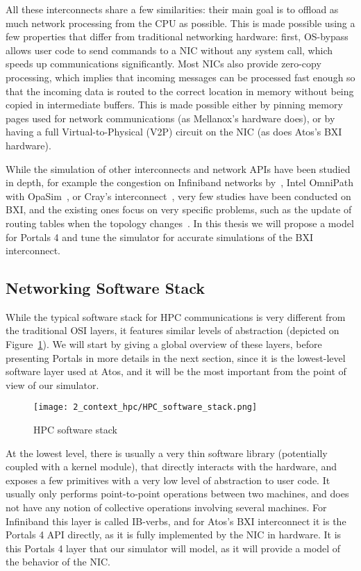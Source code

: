 All these interconnects share a few similarities: their main goal is to offload
as much network processing from the CPU as possible. This is made possible using
a few properties that differ from traditional networking hardware: first,
OS-bypass allows user code to send commands to a NIC without any system call,
which speeds up communications significantly. Most NICs also provide zero-copy
processing, which implies that incoming messages can be processed fast enough so
that the incoming data is routed to the correct location in memory without being
copied in intermediate buffers. This is made possible either by pinning memory
pages used for network communications (as Mellanox's hardware does), or by
having a full Virtual-to-Physical (V2P) circuit on the NIC (as does Atos's BXI
hardware).

While the simulation of other interconnects and network APIs have been studied
in depth, for example the congestion on Infiniband networks
by~\cite{Vienne2010}\cite{Gran2012}, Intel OmniPath with
OpaSim~\cite{Javier2018}, or Cray's interconnect~\cite{Mubarak2017}, very few
studies have been conducted on BXI, and the existing ones focus on very specific
problems, such as the update of routing tables when the topology
changes~\cite{Vigneras2016}. In this thesis we will propose a model for Portals
4 and tune the simulator for accurate simulations of the BXI interconnect.

\subsection{Networking Software Stack}
\label{subsec:2_context_hpc:software_stack}

While the typical software stack for HPC communications is very different from
the traditional OSI layers, it features similar levels of abstraction (depicted
on Figure~\ref{fig:2_context_hpc:HpcSoftwareStack}). We will start by giving a
global overview of these layers, before presenting Portals in more details in
the next section, since it is the lowest-level software layer used at Atos, and
it will be the most important from the point of view of our
simulator.

\begin{figure}[!ht]
    \centering
    \texttt{[image: 2\_context\_hpc/HPC\_software\_stack.png]}
    \caption{HPC software stack}
    \label{fig:2_context_hpc:HpcSoftwareStack}
\end{figure}

At the lowest level, there is usually a very thin software library (potentially
coupled with a kernel module), that directly interacts with the hardware, and
exposes a few primitives with a very low level of abstraction to user code. It
usually only performs point-to-point operations between two machines, and does
not have any notion of collective operations involving several machines. For
Infiniband this layer is called IB-verbs, and for Atos's BXI interconnect it is
the Portals 4 API directly, as it is fully implemented by the NIC in hardware.
It is this Portals 4 layer that our simulator will model, as it will provide a
model of the behavior of the NIC.

